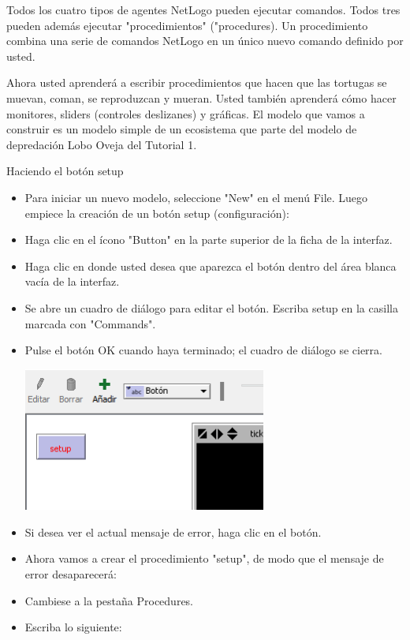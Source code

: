 \documentclass[12pt,letterpaper]{article}
\begin{document}
Todos los cuatro tipos de agentes NetLogo pueden ejecutar comandos. Todos tres pueden además ejecutar "procedimientos" ("procedures). Un procedimiento combina una serie de comandos NetLogo en un único nuevo comando definido por usted.


Ahora usted aprenderá a escribir procedimientos que hacen que las tortugas se muevan, coman, se reproduzcan y mueran.  Usted también aprenderá cómo hacer monitores, sliders (controles deslizanes) y gráficas. El modelo que vamos a construir es un modelo  simple de un ecosistema que parte del modelo de depredación Lobo Oveja del Tutorial 1.

\begin{center}
Haciendo el botón setup
\end{center}

\begin{itemize}

\renewcommand{\labelitemi}{\scriptsize$\blacksquare$}

\item Para iniciar un nuevo modelo, seleccione "New" en el menú File. Luego empiece la creación de un botón setup (configuración):
\item Haga clic en el ícono "Button" en la parte superior de la ficha de la interfaz.
\item Haga clic en donde usted desea que aparezca el botón dentro del área blanca vacía de la interfaz.
\item Se abre un cuadro de diálogo para editar el botón. Escriba setup en la casilla marcada con "Commands".
\item Pulse el botón OK cuando haya terminado; el cuadro de diálogo se cierra.


\begin{center}
	\includegraphics[width=8cm]{./imagenes/image1.png}
\end{center}


\item Si desea ver el actual mensaje de error, haga clic en el botón.
\item Ahora vamos a crear el procedimiento "setup", de modo que el mensaje de error desaparecerá:
\item Cambiese a la pestaña Procedures.
\item Escriba lo siguiente:



\end{itemize}
\end{document}

